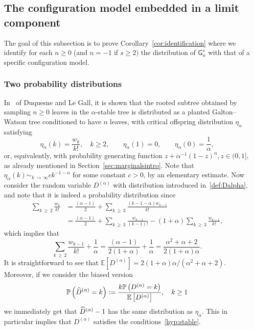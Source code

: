 \documentclass[AHL,Unicode,longabstracts,published]{cedram}
\newcommand{\sG}{\mathsf{G}}
\newcommand{\bbE}{\mathbb{E}}
\newcommand{\bbP}{\mathbb{P}}
\let\oldhat\hat
\renewcommand*{\hat}[1]{\mathchoice{\widehat{#1}}{\widehat{#1}}{\oldhat{#1}}{\oldhat{#1}}}
\begin{document}
\subsection{The configuration model embedded in a limit component}\label{sec:configembedded}

The goal of this subsection is to prove Corollary~\ref{cor:identification} where we identify for each $n \geq 0$ (and $n=-1$ if $s\geq 2)$ the distribution of $\sG_n^s$ with that of a specific configuration model.

\subsubsection{Two probability distributions}
In~\cite[Section~3.3]{DuquesneLeGall} of Duquesne and Le Gall, it is shown that the rooted subtree obtained by sampling $n \geq 0$ leaves in the $\alpha$-stable tree is distributed as a planted Galton--Watson tree conditioned to have $n$ leaves, with critical offspring distribution $\eta_\alpha$ satisfying
\[
\eta_\alpha(k)=\frac{w_k}{k!}, \quad k \geq 2, \quad \quad \eta_\alpha(1)=0, \quad \quad \eta_\alpha(0)=\frac{1}{\alpha},
\]
or, equivalently, with probability generating function $z+\alpha^{-1}(1-z)^{\alpha}, z \in (0,1],$ as already mentioned in Section~\ref{sec:marginalsintro}. Note that $\eta_{\alpha}(k) \sim_{k\,\rightarrow\,\infty} c k^{-1-\alpha}$ for some constant $c>0$, by an elementary estimate. Now consider the random variable $D^{(\alpha)}$ with distribution introduced in~\eqref{def:Dalpha}, and note that it is indeed a probability distribution since
\begin{align*}
\sum_{k\,\geq\,2}\frac{w_k}{k!} &=\frac{(\alpha-1)}{2}+\sum_{k\,\geq\,3}\frac{\left(k-1-\alpha\right)w_{k-1}}{k!}\\
 &= \frac{(\alpha-1)}{2}+\sum_{k\,\geq\,3}\frac{w_{k-1}}{(k-1)!}-(1+\alpha) \sum_{k\,\geq\,3}\frac{w_{k-1}}{k!},
\end{align*}
which implies that
\[
\sum_{k\,\geq\,2}\frac{w_{k-1}}{k!}+\frac{1}{\alpha}= \frac{(\alpha-1)}{2(1+\alpha)}+\frac{1}{\alpha}=\frac{\alpha^2+\alpha+2}{2(1+\alpha)\alpha}.
\]
It is straightforward to see that $\bbE[D^{(\alpha)}]=2(1+\alpha)\alpha/(\alpha^2+\alpha+2)$. Moreover, if we consider the biased version
\[
\bbP\left(\hat{D}^{(\alpha)}=k\right):=\frac{k \bbP\left(D^{(\alpha)}=k\right)}{\bbE\left[D^{(\alpha)}\right]}, \quad k\geq 1
\]
we immediately get that $\hat{D}^{(\alpha)}-1$ has the same distribution as $\eta_\alpha$. This in particular implies that $D^{(\alpha)}$ satisfies the conditions~\eqref{hyp:stable}.
\end{document}
